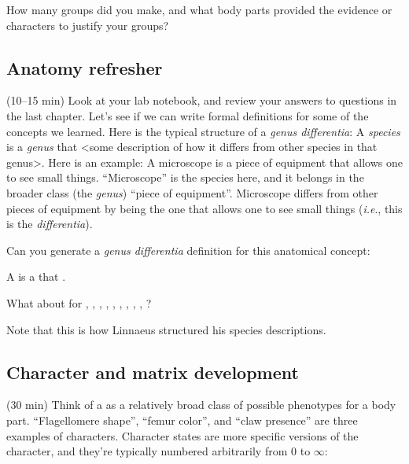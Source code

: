 \begin{theo} 
{}How many groups did you make, and what body parts provided the evidence or characters to justify your groups?\end{theo}

\subsection{Anatomy refresher}
(10--15 min) Look at your lab notebook, and review your answers to questions in the last chapter. Let's see if we can write formal definitions for some of the concepts we learned. Here is the typical structure of a \textit{genus differentia}: A \textit{species} is a \textit{genus} that \textless{}some description of how it differs from other species in that genus\textgreater{}. Here is an example: A microscope is a piece of equipment that allows one to see small things. ``Microscope'' is the species here, and it belongs in the broader class (the \textit{genus}) ``piece of equipment''. Microscope differs from other pieces of equipment by being the one that allows one to see small things (\textit{i.e}., this is the \textit{differentia}).\vspace{3mm}

\begin{theo} 
{}Can you generate a \textit{genus differentia} definition for this anatomical concept:\vspace{3mm}

A  is a \makebox[30 mm]{\hrulefill} that \hrulefill.\vspace{3mm} 

\noindent{}What about for , , , , , , , , , ?\vspace{3mm}

\noindent{}Note that this is how Linnaeus structured his species descriptions.
\end{theo}

\subsection{Character and matrix development}
(30 min) Think of a  as a relatively broad class of possible phenotypes for a body part. ``Flagellomere shape'', ``femur color'', and ``claw presence'' are three examples of characters. Character states are more specific versions of the character, and they're typically numbered arbitrarily from 0 to $\infty$:\vspace{3mm}


